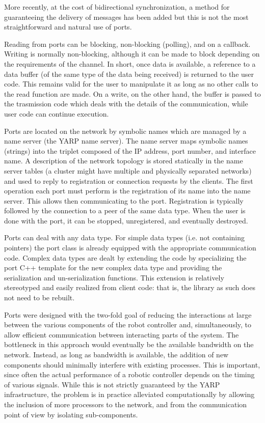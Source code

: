 More recently, at the cost of bidirectional synchronization, a method for guaranteeing
the delivery of messages has been added but this is not the most straightforward and
natural use of ports.

Reading from ports can be blocking, non-blocking (polling), and on a callback. Writing is
normally non-blocking, although it can be made to block depending on the requirements
of the channel. In short, once data is available, a reference to a data buffer (of the 
same type of the data being received) is returned to the user code. This remains valid
for the user to manipulate it as long as no other calls to the read function are made.
On a write, on the other hand, the buffer is passed to the trasmission code which deals
with the details of the communication, while user code can continue execution.

Ports are located on the network by symbolic names which are managed by a name server
(the YARP name server). The name server maps symbolic names (strings) into the triplet 
composed of the IP address, port number, and interface name. A description of the network 
topology is stored statically in the name server tables (a cluster might have multiple 
and physically separated networks) and used to reply to registration or connection 
requests by the clients. The first operation each port must perform is the registration 
of its name into the name server. This allows then communicating to the port. Registration 
is typically followed by the connection to a peer of the same data type. When the user is 
done with the port, it can be stopped, unregistered, and eventually destroyed.

Ports can deal with any data type. For simple data types (i.e. not containing pointers) 
the port class is already equipped with the appropriate communication code. Complex data
types are dealt by extending the code by specializing the port C++ template for the 
new complex data type and providing the serialization and un-serialization functions. 
This extension is relatively stereotyped and easily realized from client code: that is, 
the library as such does not need to be rebuilt.

Ports were designed with the two-fold goal of reducing the interactions at large between 
the various components of the robot controller and, simultaneously, to allow efficient 
communication between interacting parts of the system. The bottleneck in this approach
would eventually be the available bandwidth on the network. Instead, as long as bandwidth
is available, the addition of new components should minimally interfere with existing 
processes. This is important, since often the actual performance of a robotic controller
depends on the timing of various signals. While this is not strictly guaranteed by the 
YARP infrastructure, the problem is in practice alleviated computationally by allowing 
the inclusion of more processors to the network, and from the communication point of view
by isolating sub-components.

